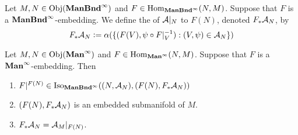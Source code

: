 \documentclass{book}
\begin{document}
	\begin{defn} 
		Let $M, N \in \Obj(\ManBndinf)$ and $F \in \Hom_{\ManBndinf}(N, M)$. Suppose that $F$ is a  $\ManBndinf$-embedding. We define the  of $\MA|_N$ to $F(N)$, denoted $F_*\MA_N$, by 
		$$F_*\MA_N \defeq \al (\{(F(V), \psi \circ F|_V^{-1}): (V, \psi) \in \MA_N\})$$
	\end{defn}

	\begin{ex}
		Let $M, N \in \Obj(\Maninf)$ and  $F \in \Hom_{\Maninf}(N, M)$. Suppose that $F$ is a  $\Maninf$-embedding. Then
		\begin{enumerate}
			\item $F|^{F(N)} \in \Iso_{\ManBndinf}((N, \MA_N), (F(N), F_*\MA_N))$
			\item $(F(N), F_*\MA_N)$ is an embedded submanifold of $M$. 
			\item $F_*\MA_N = \MA_M|_{F(N)}$.
		\end{enumerate}
	\end{ex}
	
\end{document}
